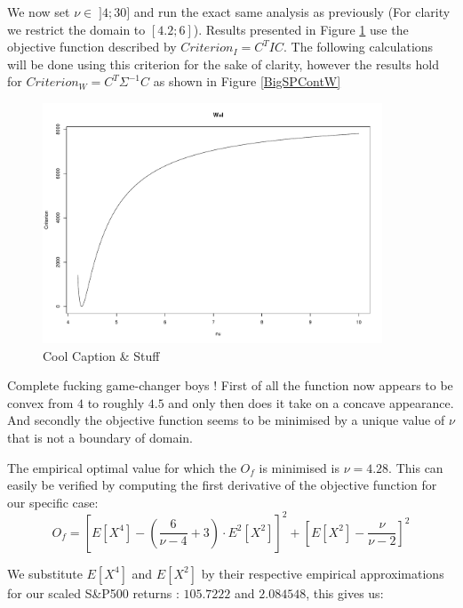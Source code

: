 We now set $\nu \in \; ]4;30]$ and run the exact same analysis as previously (For clarity we restrict the domain to $[4.2;6]$). Results presented in Figure \ref{fig:BigSPContI} use the objective function described by $Criterion_I = C^T I C$. The following calculations will be done using this criterion for the sake of clarity, however the results hold for $Criterion_W = C^T \Sigma^{-1} C$ as shown in Figure \ref{BigSPContW} \bigskip
\begin{figure}
    \centering
    \includegraphics[width=0.9\textwidth]{SP500_Continuous_I.pdf}
    \caption{Cool Caption \& Stuff}
    \label{fig:BigSPContI}
\end{figure}
\par
Complete fucking game-changer boys ! First of all the function now appears to be convex from $4$ to roughly $4.5$ and only then does it take on a concave appearance. And secondly the objective function seems to be minimised by a unique value of $\nu$ that is not a boundary of domain.
\par
The empirical optimal value for which the $O_f$ is minimised is $\nu=4.28$. 
This can easily be verified by computing the first derivative of the objective function for our specific case:
\begin{equation}\label{ObjectiveFunction_I}
    O_f = \left[E\left[X^4\right] - \left(\frac{6}{\nu-4}+3\right)\cdot         
                E^2\left[X^2\right]\right]^2 +
            \left[E\left[X^2\right] - \frac{\nu}{\nu - 2}\right]^2
\end{equation}

We substitute $E\left[X^4\right]$ and $E\left[X^2\right]$ by their respective empirical approximations for our scaled S\&P500 returns : $105.7222$ and $2.084548$, this gives us:

